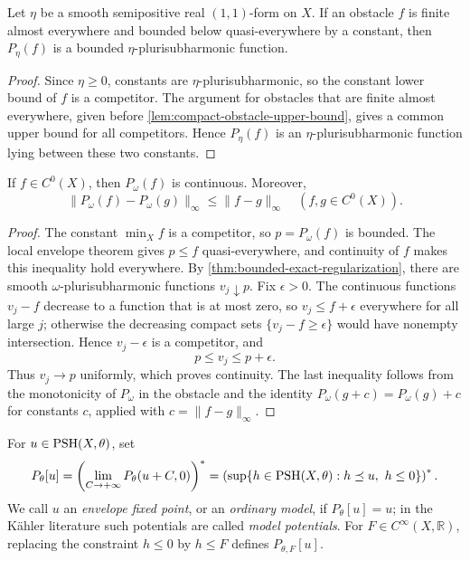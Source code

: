 \begin{lemma}\label{lem:bounded-below-envelope}
Let $\eta$ be a smooth semipositive real $(1,1)$-form on $X$. If an obstacle $f$ is finite almost everywhere and bounded below quasi-everywhere by a constant, then $P_\eta(f)$ is a bounded $\eta$-plurisubharmonic function.
\end{lemma}
\begin{proof}
Since $\eta\geq0$, constants are $\eta$-plurisubharmonic, so the constant lower bound of $f$ is a competitor. The argument for obstacles that are finite almost everywhere, given before \cref{lem:compact-obstacle-upper-bound}, gives a common upper bound for all competitors. Hence $P_\eta(f)$ is an $\eta$-plurisubharmonic function lying between these two constants.
\end{proof}

\begin{proposition}
\label{prop:continuous-obstacle-envelope}
If $f\in C^0(X)$, then $P_\omega(f)$ is continuous. Moreover,
\[
 \|P_\omega(f)-P_\omega(g)\|_\infty\leq\|f-g\|_\infty
 \quad(f,g\in C^0(X)).
\]
\end{proposition}
\begin{proof}
The constant $\min_Xf$ is a competitor, so $p=P_\omega(f)$ is bounded. The local envelope theorem gives $p\leq f$ quasi-everywhere, and continuity of $f$ makes this inequality hold everywhere. By \cref{thm:bounded-exact-regularization}, there are smooth $\omega$-plurisubharmonic functions $v_j\downarrow p$. Fix $\epsilon>0$. The continuous functions $v_j-f$ decrease to a function that is at most zero, so $v_j\leq f+\epsilon$ everywhere for all large $j$; otherwise the decreasing compact sets $\{v_j-f\geq\epsilon\}$ would have nonempty intersection. Hence $v_j-\epsilon$ is a competitor, and
\[
 p\leq v_j\leq p+\epsilon.
\]
Thus $v_j\to p$ uniformly, which proves continuity. The last inequality follows from the monotonicity of $P_\omega$ in the obstacle and the identity $P_\omega(g+c)=P_\omega(g)+c$ for constants $c$, applied with $c=\|f-g\|_\infty$.
\end{proof}

\begin{definition}\label{def:singularity-envelope}
For $u\in\mathrm{PSH}(X,\theta)$, set
\[
 P_\theta[u]
 =\left(\lim_{C\to+\infty}P_\theta(u+C,0)\right)^*
 =\left(\sup\{h\in\mathrm{PSH}(X,\theta):h\preceq u,\ h\leq0\}\right)^*.
\]
We call $u$ an \emph{envelope fixed point}, or an \emph{ordinary model}, if $P_\theta[u]=u$; in the K\"ahler literature such potentials are called \emph{model potentials}.
For $F\in C^\infty(X,\mathbb R)$, replacing the constraint $h\leq0$ by $h\leq F$ defines $P_{\theta,F}[u]$.
\end{definition}

